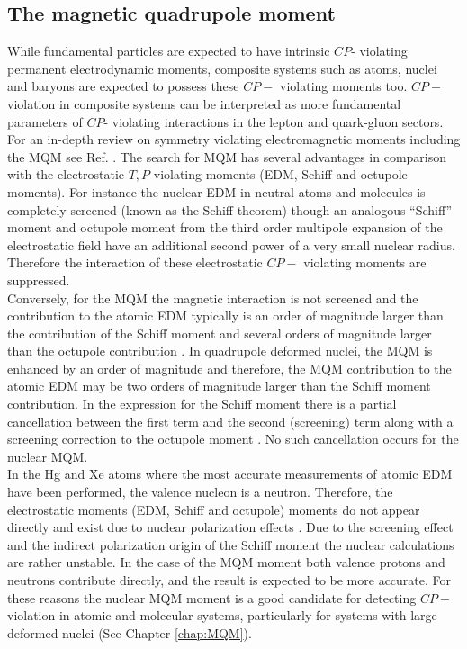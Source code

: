 \documentclass[10pt,a4paper, twoside, openright]{report}
\begin{document}
\subsection{The magnetic quadrupole moment}
While fundamental particles are expected to have intrinsic $CP$- violating permanent electrodynamic moments, composite systems such as atoms, nuclei and baryons are expected to possess these $CP-$ violating moments too. $CP-$ violation in composite systems can be interpreted as more fundamental parameters of $CP$- violating interactions in the lepton and quark-gluon sectors. For an in-depth review on symmetry violating electromagnetic moments including the MQM see Ref. \cite{GF2004, KhriplovichPNC, SFK1984, Roberts2015, KhriplovichCP, Pospelov2005}. The search for MQM has several advantages in comparison with the electrostatic $T,P$-violating moments (EDM, Schiff and octupole moments). For instance the nuclear EDM in neutral atoms and molecules is completely screened (known as the Schiff theorem\cite{Schiff1963}) though an analogous ``Schiff'' moment and octupole moment from the third order multipole expansion of the electrostatic field have an additional second power of a very small nuclear radius. Therefore the interaction of these electrostatic $CP-$ violating moments are suppressed. \\
\linebreak 
Conversely, for the MQM the magnetic interaction is not screened and the contribution to the atomic EDM typically is an order of magnitude larger than the contribution of the Schiff moment and several orders of magnitude larger than the octupole contribution \cite{SFK1984, Flambaum1997}.  In quadrupole deformed nuclei, the MQM is enhanced by an order of magnitude \cite{Flambaum1994} and therefore, the MQM contribution to the atomic EDM may be two orders of magnitude larger than the Schiff moment contribution. In the expression for the Schiff moment there is a partial cancellation between the first term and the second (screening) term along with a screening correction to the octupole moment \cite{ Flambaum1986, SFK1984, Flambaum2012}. No such cancellation occurs for the nuclear MQM.\\
\linebreak
In the Hg and Xe atoms  where the most accurate measurements of atomic EDM have been performed, the valence nucleon is a neutron. Therefore, the electrostatic moments (EDM, Schiff and octupole) moments do not appear directly and exist due to nuclear polarization effects \cite{Flambaum1986}. Due to the screening effect and the indirect polarization origin of the Schiff moment the nuclear calculations are rather unstable. In the case of the MQM moment both valence protons and neutrons  contribute directly, and the result is expected to be more accurate\cite{Flambaum2014}. For these reasons the nuclear MQM moment is a good candidate for detecting $CP-$ violation in atomic and molecular systems, particularly for systems with large deformed nuclei (See Chapter \ref{chap:MQM}).\\
\end{document}
